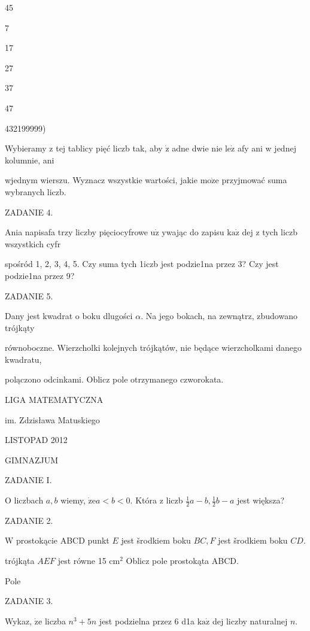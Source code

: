 \documentclass[a4paper,12pt]{article}
\begin{document}
45

7

17

27

37

47

432199999)

Wybieramy z tej tablicy pięć liczb tak, aby $\dot{\mathrm{z}}$ adne dwie nie $\mathrm{l}\mathrm{e}\dot{\mathrm{z}}$ afy ani w jednej kolumnie, ani

wjednym wierszu. Wyznacz wszystkie wartości, jakie $\mathrm{m}\mathrm{o}\dot{\mathrm{z}}\mathrm{e}$ przyjmować suma wybranych liczb.

ZADANIE 4.

Ania napisafa trzy liczby pięciocyfrowe $\mathrm{u}\dot{\mathrm{z}}$ ywając do zapisu $\mathrm{k}\mathrm{a}\dot{\mathrm{z}}$ dej z tych liczb wszystkich cyfr

spośród 1, 2, 3, 4, 5. Czy suma tych 1iczb jest podzie1na przez 3? Czy jest podzie1na przez 9?

ZADANIE 5.

Dany jest kwadrat o boku dlugości $\alpha$. Na jego bokach, na zewnątrz, zbudowano trójkąty

równoboczne. Wierzcholki kolejnych trójkątów, nie będące wierzcholkami danego kwadratu,

polączono odcinkami. Oblicz pole otrzymanego czworokata.






LIGA MATEMATYCZNA

im. Zdzisława Matuskiego

LISTOPAD 2012

GIMNAZJUM

ZADANIE I.

$\mathrm{O}$ liczbach $a, b$ wiemy, $\dot{\mathrm{z}}\mathrm{e}a<b<0$. Która z liczb $\displaystyle \frac{1}{2}a-b, \displaystyle \frac{1}{2}b-a$ jest większa?

ZADANIE 2.

$\mathrm{W}$ prostokącie ABCD punkt $E$ jest šrodkiem boku $BC, F$ jest šrodkiem boku $CD.$

trójkąta $AEF$ jest równe 15 $\mathrm{c}\mathrm{m}^{2}$ Oblicz pole prostokąta ABCD.

Pole

ZADANIE 3.

Wykaz, $\dot{\mathrm{z}}\mathrm{e}$ liczba $n^{3}+5n$ jest podzielna przez 6 d1a $\mathrm{k}\mathrm{a}\dot{\mathrm{z}}$ dej liczby naturalnej $n.$
\end{document}
